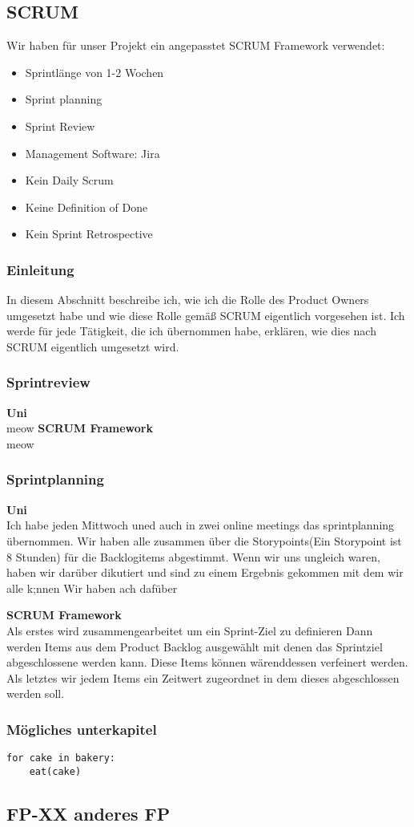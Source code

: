 \subsection{SCRUM}
Wir haben für unser Projekt ein angepasstet SCRUM Framework verwendet:
\begin{itemize}
	\item Sprintlänge von 1-2 Wochen
	\item Sprint planning
	\item Sprint Review
	\item Management Software: Jira
	\item {\selectfont{}\relax}Kein Daily Scrum
	\item {\selectfont{}\relax}Keine Definition of Done
	\item {\selectfont{}\relax}Kein Sprint Retrospective
\end{itemize}
\subsubsection{Einleitung}
In diesem Abschnitt beschreibe ich, wie ich die Rolle des Product Owners umgesetzt habe und wie diese Rolle gemäß SCRUM eigentlich vorgesehen ist.
Ich werde für jede Tätigkeit, die ich übernommen habe, erklären, wie dies nach SCRUM eigentlich umgesetzt wird.
\subsubsection{Sprintreview}
\textbf{Uni}\\
meow
\textbf{SCRUM Framework}\\
meow
\subsubsection{Sprintplanning}
\textbf{Uni}\\
Ich habe jeden Mittwoch uned auch in zwei online meetings das sprintplanning übernommen. Wir haben alle zusammen über die Storypoints(Ein Storypoint ist 8 Stunden) für die Backlogitems abgestimmt.
Wenn wir uns ungleich waren, haben wir darüber dikutiert und sind zu einem Ergebnis gekommen mit dem wir alle k;nnen
Wir haben ach dafüber  

\textbf{SCRUM Framework}\\
Als erstes wird zusammengearbeitet um ein Sprint-Ziel zu definieren
Dann werden Items aus dem Product Backlog ausgewählt mit denen das Sprintziel abgeschlossene werden kann.
Diese Items können wärenddessen verfeinert werden.
Als letztes wir jedem Items ein Zeitwert zugeordnet in dem dieses abgeschlossen werden soll.


\subsubsection{}

\subsubsection{Mögliches unterkapitel}		%
\begin{verbatim}
for cake in bakery:
	eat(cake)
\end{verbatim}
\subsection{FP-XX anderes FP}


